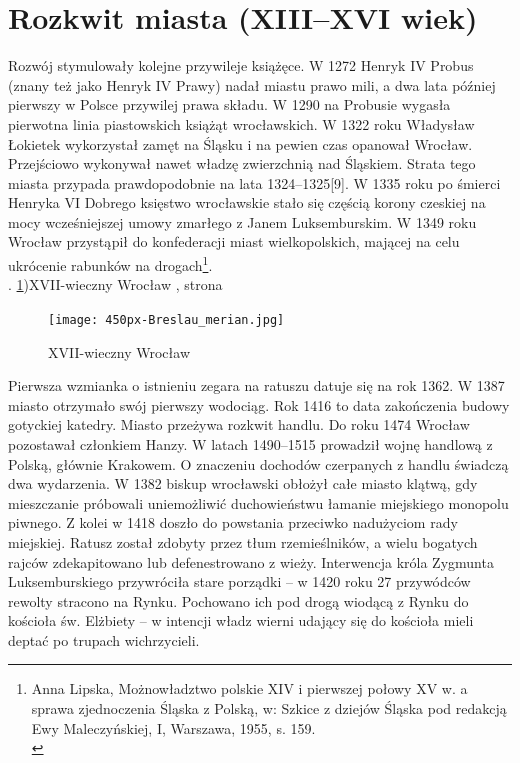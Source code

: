 \documentclass{article}
\begin{document}
\section{Rozkwit miasta (XIII–XVI wiek)}
Rozwój stymulowały kolejne przywileje książęce. W 1272 Henryk IV Probus (znany też jako Henryk IV Prawy) nadał miastu prawo mili, a dwa lata później pierwszy w Polsce przywilej prawa składu. W 1290 na Probusie wygasła pierwotna linia piastowskich książąt wrocławskich. W 1322 roku Władysław Łokietek wykorzystał zamęt na Śląsku i na pewien czas opanował Wrocław. Przejściowo wykonywał nawet władzę zwierzchnią nad Śląskiem. Strata tego miasta przypada prawdopodobnie na lata 1324–1325[9]. W 1335 roku po śmierci Henryka VI Dobrego księstwo wrocławskie stało się częścią korony czeskiej na mocy wcześniejszej umowy zmarłego z Janem Luksemburskim.
\vspace{3mm} %
\newline W 1349 roku Wrocław przystąpił do konfederacji miast wielkopolskich, mającej na celu ukrócenie rabunków na drogach\footnote{Anna Lipska, Możnowładztwo polskie XIV i pierwszej połowy XV w. a sprawa zjednoczenia Śląska z Polską, w: Szkice z dziejów Śląska pod redakcją Ewy Maleczyńskiej, I, Warszawa, 1955, s. 159.\\}.\\.
\newline\ref{fig:XVII})XVII-wieczny Wrocław , strona \pageref{fig:XVII}
\begin{figure}[h!]
\centering
\texttt{[image: 450px-Breslau\_merian.jpg]}
\caption{XVII-wieczny Wrocław}
\label{fig:XVII}
\end{figure}
\vspace{3mm} %
\newline Pierwsza wzmianka o istnieniu zegara na ratuszu datuje się na rok 1362. W 1387 miasto otrzymało swój pierwszy wodociąg. Rok 1416 to data zakończenia budowy gotyckiej katedry. Miasto przeżywa rozkwit handlu. Do roku 1474 Wrocław pozostawał członkiem Hanzy. W latach 1490–1515 prowadził wojnę handlową z Polską, głównie Krakowem.
\vspace{3mm} %
\newline O znaczeniu dochodów czerpanych z handlu świadczą dwa wydarzenia. W 1382 biskup wrocławski obłożył całe miasto klątwą, gdy mieszczanie próbowali uniemożliwić duchowieństwu łamanie miejskiego monopolu piwnego. Z kolei w 1418 doszło do powstania przeciwko nadużyciom rady miejskiej. Ratusz został zdobyty przez tłum rzemieślników, a wielu bogatych rajców zdekapitowano lub defenestrowano z wieży. Interwencja króla Zygmunta Luksemburskiego przywróciła stare porządki – w 1420 roku 27 przywódców rewolty stracono na Rynku. Pochowano ich pod drogą wiodącą z Rynku do kościoła św. Elżbiety – w intencji władz wierni udający się do kościoła mieli deptać po trupach wichrzycieli.
\end{document}
